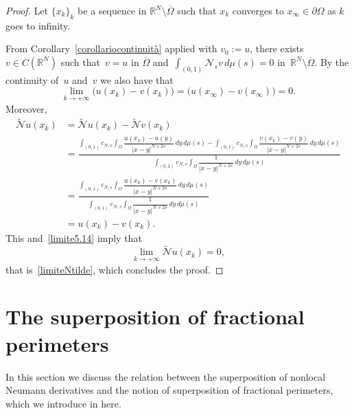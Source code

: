 \documentclass[12pt,a4paper,intlimits,sumlimits]{amsart}
\def \R {\mathbb{R}}
\def \Ns {\mathscr{N}_{s}}
\theoremstyle{definition}
\theoremstyle{plain}
\numberwithin{equation}{section}
\begin{document}
\begin{proof}
Let $\{x_k\}_k$ be a sequence in $\R^N\setminus \overline{\Omega}$
such that $x_k$ converges to $x_\infty\in \partial \Omega$ as $k$
goes to infinity.

{F}rom Corollary~\ref{corollariocontinuità} applied with $v_0:=u$,
there exists~$v\in C(\R^N)$ such that~$v=u$ in $\overline{\Omega}$
and~$\int_{(0,1)}\Ns v\,d\mu(s)=0$ in~$\R^N\setminus \overline{\Omega}$. By the continuity of~$u$ and~$v$ we also have
that 
\begin{equation}\label{limite5.14}
\lim_{k\to +\infty}\big(u(x_k)-v(x_k)\big)
=\big(u(x_\infty)-v(x_\infty)\big)=0.
\end{equation}
Moreover,
\[
\begin{aligned}
\widetilde{\mathscr N}u(x_k)&=\widetilde{\mathscr N}u(x_k)-\widetilde{\mathscr N}v(x_k)\\
&=\frac{\displaystyle\int_{(0,1)}c_{N, s}\int_{\Omega}\dfrac{u(x_k)-u(y)}{|x-y|^{N+2s}}\,dy\,d\mu(s)-\displaystyle\int_{(0,1)}c_{N, s}\int_{\Omega}\dfrac{v(x_k)-v(y)}{|x-y|^{N+2s}}\,dy\,d\mu(s)}{\displaystyle\int_{(0,1)}c_{N, s}\int_{\Omega}\dfrac{1}{|x-y|^{N+2s}}\,dy\,d\mu(s)}\\
&=\frac{\displaystyle\int_{(0,1)}c_{N, s}\int_{\Omega}\dfrac{u(x_k)-v(x_k)}{|x-y|^{N+2s}}\,dy\,d\mu(s)}{\displaystyle\int_{(0,1)}c_{N, s}\int_{\Omega}\dfrac{1}{|x-y|^{N+2s}}\,dy\,d\mu(s)}\\
&=u(x_k)-v(x_k).
\end{aligned}
\]
This and~\eqref{limite5.14} imply that
\[
\lim_{k\to +\infty}\widetilde{\mathscr N}u(x_k)=0,
\]
that is~\eqref{limiteNtilde}, which concludes the proof.
\end{proof}

\section{The superposition of fractional perimeters}\label{OSJDNDNMwefV}
In this section we discuss the relation between the superposition of nonlocal Neumann derivatives and the notion of superposition of fractional perimeters, which we introduce in here.
\end{document}
